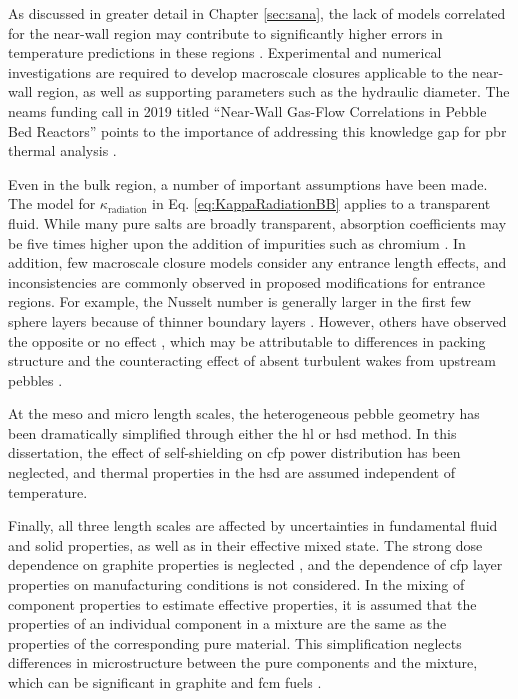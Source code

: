 As discussed in greater detail in Chapter \ref{sec:sana}, the lack of models correlated for the near-wall region may contribute to significantly higher errors in temperature predictions in these regions \cite{novak_2019}. Experimental and numerical investigations are required to develop macroscale closures applicable to the near-wall region, as well as supporting parameters such as the hydraulic diameter. The \gls{neams} funding call in 2019 titled ``Near-Wall Gas-Flow Correlations in Pebble Bed Reactors'' points to the importance of addressing this knowledge gap for \gls{pbr} thermal analysis \cite{neams2}. 

Even in the bulk region, a number of important assumptions have been made. The model for \(\kappa_\text{radiation}\) in Eq. \eqref{eq:KappaRadiationBB} applies to a transparent fluid. While many pure salts are broadly transparent, absorption coefficients may be five times higher upon the addition of impurities such as chromium \cite{chaleff}. In addition, few macroscale closure models consider any entrance length effects, and inconsistencies are commonly observed in proposed modifications for entrance regions. For example, the Nusselt number is generally larger in the first few sphere layers because of thinner boundary layers \cite{ferng,song}. However, others have observed the opposite \cite{KTAhtc} or no effect \cite{song}, which may be attributable to differences in packing structure and the counteracting effect of absent turbulent wakes from upstream pebbles \cite{achenbach}. 

At the meso and micro length scales, the heterogeneous pebble geometry has been dramatically simplified through either the \gls{hl} or \gls{hsd} method. In this dissertation, the effect of self-shielding on \gls{cfp} power distribution has been neglected, and thermal properties in the \gls{hsd} are assumed independent of temperature. 

Finally, all three length scales are affected by uncertainties in fundamental fluid and solid properties, as well as in their effective mixed state. The strong dose dependence on graphite properties is neglected \cite{seker}, and the dependence of \gls{cfp} layer properties on manufacturing conditions is not considered. In the mixing of component properties to estimate effective properties, it is assumed that the properties of an individual component in a mixture are the same as the properties of the corresponding pure material. This simplification neglects differences in microstructure between the pure components and the mixture, which can be significant in graphite and \gls{fcm} fuels \cite{folsom,lee2017}.


